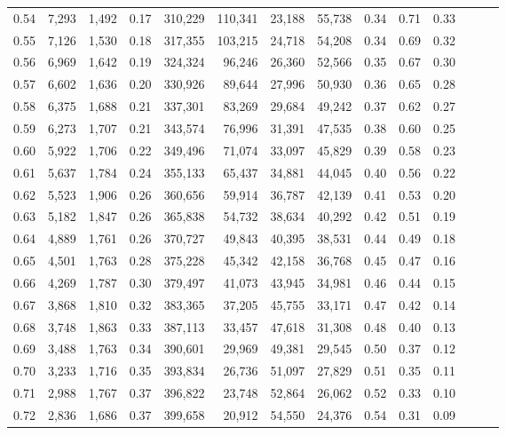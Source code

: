 \begin{tabular}{rrrrrrrrrrrrrr}
0.54 &  7,293 &  1,492 &  0.17 &  310,229 &  110,341 &  23,188 &  55,738 &  0.34 &  0.71 &      0.33 \\
0.55 &  7,126 &  1,530 &  0.18 &  317,355 &  103,215 &  24,718 &  54,208 &  0.34 &  0.69 &      0.32 \\
0.56 &  6,969 &  1,642 &  0.19 &  324,324 &   96,246 &  26,360 &  52,566 &  0.35 &  0.67 &      0.30 \\
0.57 &  6,602 &  1,636 &  0.20 &  330,926 &   89,644 &  27,996 &  50,930 &  0.36 &  0.65 &      0.28 \\
0.58 &  6,375 &  1,688 &  0.21 &  337,301 &   83,269 &  29,684 &  49,242 &  0.37 &  0.62 &      0.27 \\
0.59 &  6,273 &  1,707 &  0.21 &  343,574 &   76,996 &  31,391 &  47,535 &  0.38 &  0.60 &      0.25 \\
0.60 &  5,922 &  1,706 &  0.22 &  349,496 &   71,074 &  33,097 &  45,829 &  0.39 &  0.58 &      0.23 \\
0.61 &  5,637 &  1,784 &  0.24 &  355,133 &   65,437 &  34,881 &  44,045 &  0.40 &  0.56 &      0.22 \\
0.62 &  5,523 &  1,906 &  0.26 &  360,656 &   59,914 &  36,787 &  42,139 &  0.41 &  0.53 &      0.20 \\
0.63 &  5,182 &  1,847 &  0.26 &  365,838 &   54,732 &  38,634 &  40,292 &  0.42 &  0.51 &      0.19 \\
0.64 &  4,889 &  1,761 &  0.26 &  370,727 &   49,843 &  40,395 &  38,531 &  0.44 &  0.49 &      0.18 \\
0.65 &  4,501 &  1,763 &  0.28 &  375,228 &   45,342 &  42,158 &  36,768 &  0.45 &  0.47 &      0.16 \\
0.66 &  4,269 &  1,787 &  0.30 &  379,497 &   41,073 &  43,945 &  34,981 &  0.46 &  0.44 &      0.15 \\
0.67 &  3,868 &  1,810 &  0.32 &  383,365 &   37,205 &  45,755 &  33,171 &  0.47 &  0.42 &      0.14 \\
0.68 &  3,748 &  1,863 &  0.33 &  387,113 &   33,457 &  47,618 &  31,308 &  0.48 &  0.40 &      0.13 \\
0.69 &  3,488 &  1,763 &  0.34 &  390,601 &   29,969 &  49,381 &  29,545 &  0.50 &  0.37 &      0.12 \\
0.70 &  3,233 &  1,716 &  0.35 &  393,834 &   26,736 &  51,097 &  27,829 &  0.51 &  0.35 &      0.11 \\
0.71 &  2,988 &  1,767 &  0.37 &  396,822 &   23,748 &  52,864 &  26,062 &  0.52 &  0.33 &      0.10 \\
0.72 &  2,836 &  1,686 &  0.37 &  399,658 &   20,912 &  54,550 &  24,376 &  0.54 &  0.31 &      0.09 \\

\end{tabular}
